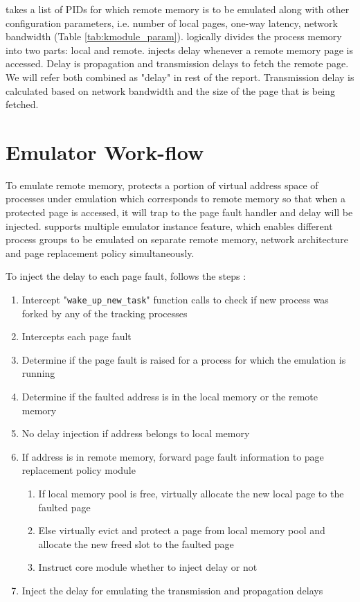 {\dime} takes a list of PIDs for which remote memory is to be emulated along with other configuration parameters, i.e. number of local pages, one-way latency, network bandwidth (Table \ref{tab:kmodule_param}). {\dime} logically divides the process memory into two parts: local and remote. {\dime} injects delay whenever a remote memory page is accessed. Delay is propagation and transmission delays to fetch the remote page. We will refer both combined as "delay" in rest of the report. Transmission delay is calculated based on network bandwidth and the size of the page that is being fetched.


\section{Emulator Work-flow}
To emulate remote memory, {\dime} protects a portion of virtual address space of processes under emulation which corresponds to remote memory so that when a protected page is accessed, it will trap to the page fault handler and delay will be injected. {\dime} supports multiple emulator instance feature, which enables different process groups to be emulated on separate remote memory, network architecture and page replacement policy simultaneously.

To inject the delay to each page fault, {\dime} follows the steps :
\begin{enumerate}
	\item Intercept "\verb|wake_up_new_task|" function calls to check if new process was forked by any of the tracking processes
    \item Intercepts each page fault
    \item Determine if the page fault is raised for a process for which the emulation is running
    \item Determine if the faulted address is in the local memory or the remote memory
    \item No delay injection if address belongs to local memory
    \item If address is in remote memory, forward page fault information to page replacement policy module
    \begin{enumerate}
        \item If local memory pool is free, virtually allocate the new local page to the faulted page
        \item Else virtually evict and protect a page from local memory pool and allocate the new freed slot to the faulted page
        \item Instruct core module whether to inject delay or not
    \end{enumerate}
    \item Inject the delay for emulating the transmission and propagation delays
\end{enumerate}



